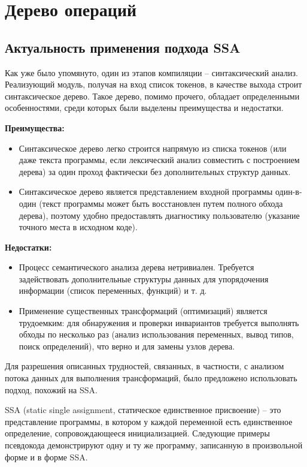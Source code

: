 \newpage
\section{Дерево операций}
\label{sec:optree}

\subsection{Актуальность применения подхода SSA}
\label{sec:optree_ssa}

Как уже было упомянуто, один из этапов компиляции -- синтаксический анализ.
Реализующий модуль, получая на вход список токенов, в качестве выхода строит синтаксическое дерево.
Такое дерево, помимо прочего, обладает определенными особенностями, среди которых были выделены преимущества и недостатки.

\textbf{Преимущества:}

\begin{itemize}
    \item Синтаксическое дерево легко строится напрямую из списка токенов (или даже текста программы, если лексический анализ совместить с построением дерева) за один проход фактически без дополнительных структур данных.
    \item Синтаксическое дерево является представлением входной программы один-в-один (текст программы может быть восстановлен путем полного обхода дерева), поэтому удобно предоставлять диагностику пользователю (указание точного места в исходном коде).
\end{itemize}

\textbf{Недостатки:}

\begin{itemize}
    \item Процесс семантического анализа дерева нетривиален. Требуется задействовать дополнительные структуры данных для упорядочения информации (список переменных, функций) и т. д.
    \item Применение существенных трансформаций (оптимизаций) является трудоемким: для обнаружения и проверки инвариантов требуется выполнять обходы по несколько раз (анализ использования переменных, вывод типов, поиск определений), что верно и для замены узлов дерева.
\end{itemize}

Для разрешения описанных трудностей, связанных, в частности, с анализом потока данных для выполнения трансформаций, было предложено использовать подход, похожий на SSA.

SSA (static single assignment, статическое единственное присвоение) -- это представление программы, в котором у каждой переменной есть единственное определение, сопровождающееся инициализацией.
Следующие примеры псевдокода демонстрируют одну и ту же программу, записанную в произвольной форме и в форме SSA.

